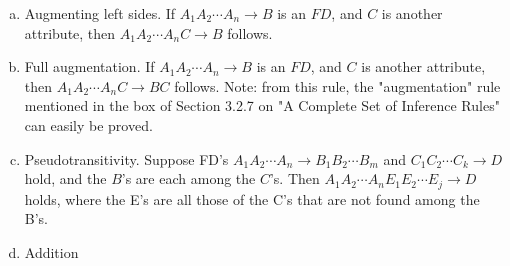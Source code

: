 \documentclass[12pt]{article}
\begin{document}
\begin{enumerate}[1.]
    \begin{enumerate}[a)]
        \item Augmenting left sides. If $A_1 A_2 \cdots A_n \to B$ is an $FD$, and $C$ is another attribute, then $A_1 A_2 \cdots A_nC \to B$ follows.
        \item Full augmentation. If $A_1 A_2 \cdots  A_n \to B$ is an $FD$, and $C$ is another attribute, then $A_1A_2 \cdots  A_nC \to BC$ follows. Note: from this rule, the "augmentation" rule mentioned in the box of Section 3.2.7 on "A Complete Set of Inference Rules" can easily be proved.
        \item Pseudotransitivity. Suppose FD's $A_1 A_2 \cdots  A_n \to B_1B_2 \cdots  B_m$ and $C_1C_2 \cdots C_k \to D$ hold, and the $B$'s are each among the $C$'s. Then $A_1A_2 \cdots A_n E_1 E_2 \cdots E_j \to D$  holds, where the E's are all those of the C's that are not found among the B's.
        \item Addition
    \end{enumerate}

\end{enumerate}
\end{document}
